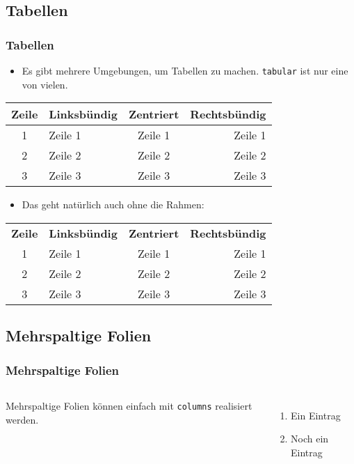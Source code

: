\subsection{Tabellen}

\begin{frame}[fragile]
	\frametitle{Tabellen}
	\begin{itemize}
		\item Es gibt mehrere Umgebungen, um Tabellen zu machen. \texttt{tabular} ist nur eine von vielen.
	\end{itemize}
	
	\begin{center}
		\begin{tabular}{|c|l|c|r|}
			\hline
			\textbf{Zeile} & \textbf{Linksbündig} & \textbf{Zentriert} & \textbf{Rechtsbündig} \\
			\hline\hline
			1 & Zeile 1 & Zeile 1 & Zeile 1 \\
			2 & Zeile 2 & Zeile 2 & Zeile 2 \\
			3 & Zeile 3 & Zeile 3 & Zeile 3 \\
			\hline
		\end{tabular}
	\end{center}
	
	\begin{itemize}
		\item Das geht natürlich auch ohne die Rahmen:
	\end{itemize}
	
	\begin{center}
		\begin{tabular}{clcr}
			\textbf{Zeile} & \textbf{Linksbündig} & \textbf{Zentriert} & \textbf{Rechtsbündig} \\
			1 & Zeile 1 & Zeile 1 & Zeile 1 \\
			2 & Zeile 2 & Zeile 2 & Zeile 2 \\
			3 & Zeile 3 & Zeile 3 & Zeile 3 \\
		\end{tabular}
	\end{center}
\end{frame}

\subsection{Mehrspaltige Folien}

\begin{frame}
	\frametitle{Mehrspaltige Folien}
	\begin{columns}
		Mehrspaltige Folien können einfach mit \texttt{columns} realisiert werden.
		\begin{enumerate}
			\item Ein Eintrag
			\item Noch ein Eintrag
		\end{enumerate}
	\end{columns}
\end{frame}
